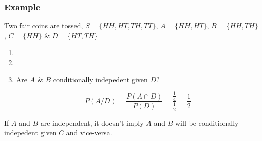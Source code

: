\documentclass{article}
\begin{document}
\subsubsection{Example}
Two fair coins are tossed, $S=\{HH, HT, TH, TT \}$, $A=\{HH, HT \} $, $B=\{HH, TH\} $, $C=\{HH \}$ \& $D=\{HT, TH\}$


\begin{enumerate}
    \item
    \item
    \item Are $A$ \& $B$ conditionally indepedent given $D$?

    $$P(A/D)= \frac{P(A\cap D)}{P(D)}= \frac{\frac{1}{4}}{\frac{1}{2}}=\frac{1}{2} $$
\end{enumerate}

If $A$ and $B$ are independent, it doesn't imply $A$ and $B$ will be conditionally indepedent given $C$ and vice-versa.
\end{document}
